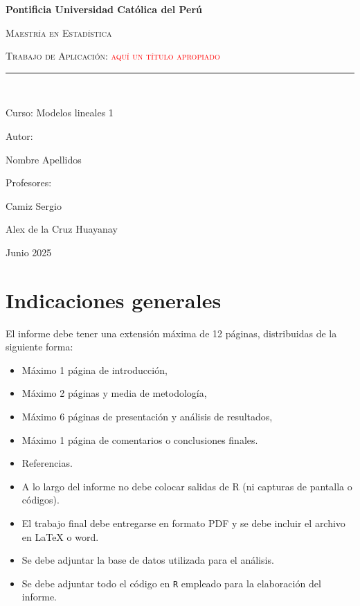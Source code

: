 \documentclass[12pt]{article}
\begin{document}
\begin{titlepage}
\centering
{\bfseries\large Pontificia Universidad Católica del Perú \par}
\vspace{1cm}
{\scshape\large Maestría en Estadística \par}
\vspace{1cm}
{\scshape\large Trabajo de Aplicación: \textcolor{red}{aquí un título apropiado} \par}

\rule{150mm}{0.1mm}\\  
\vspace{3cm}
{\large Curso: Modelos lineales 1 \par}
\vfill
{\large Autor: \par}
{\large Nombre Apellidos \par}
\vfill
{\large Profesores: \par}
{\large Camiz Sergio \par}
{\large Alex de la Cruz Huayanay \par}
\vfill
{\large Junio 2025 \par}
\end{titlepage}

\section*{Indicaciones generales}

\noindent El informe debe tener una extensión máxima de 12 páginas, distribuidas de la siguiente forma:  
    \begin{itemize}
        \item Máximo 1 página de introducción,
        \item Máximo 2 páginas y media de metodología,
        \item Máximo 6 páginas de presentación y análisis de resultados,
        \item Máximo 1 página de comentarios o conclusiones finales.
        \item Referencias.
    \end{itemize}

\begin{itemize}
    \item A lo largo del informe no debe colocar salidas de R (ni capturas de pantalla o códigos).
    
    \item El trabajo final debe entregarse en formato PDF y se debe incluir el archivo en LaTeX o word.

    \item Se debe adjuntar la base de datos utilizada para el análisis.

    \item Se debe adjuntar todo el código en \texttt{R} empleado para la elaboración del informe.
\end{itemize}
\end{document}
